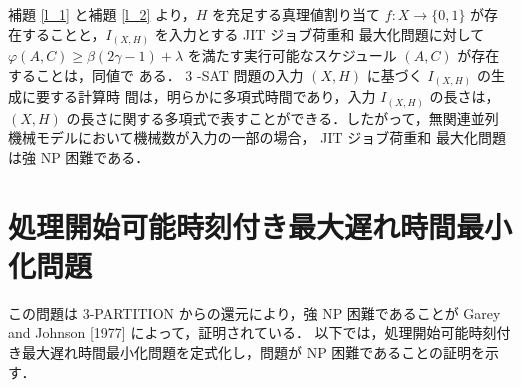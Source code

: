 \documentclass[12pt]{optlab-bachelor}
\begin{document}
補題 \ref{l_1} と補題 \ref{l_2} より，$H$ を充足する真理値割り当て $f : X \to \{0,
1\}$ が存在することと，$I_{(X,H)}$ を入力とする JIT ジョブ荷重和
最大化問題に対して $\varphi(A, C) \ge \beta(2\gamma − 1) + \lambda$
を満たす実行可能なスケジュール $(A, C)$ が存在することは，同値で
ある．
3 -SAT 問題の入力 $(X,H)$ に基づく $I_{(X,H)}$ の生成に要する計算時
間は，明らかに多項式時間であり，入力 $I_{(X,H)}$ の長さは，$(X, H)$
の長さに関する多項式で表すことができる．したがって，無関連並列
機械モデルにおいて機械数が入力の一部の場合， JIT ジョブ荷重和
最大化問題は強 NP 困難である．

\section{処理開始可能時刻付き最大遅れ時間最小化問題}\label{3_s_2}

この問題は \textsc{3-PARTITION} からの還元により，強 NP 困難であることが Garey and Johnson [1977] によって，証明されている．\cite{3SAT}
以下では，処理開始可能時刻付き最大遅れ時間最小化問題を定式化し，問題が NP 困難であることの証明を示す．
\end{document}
